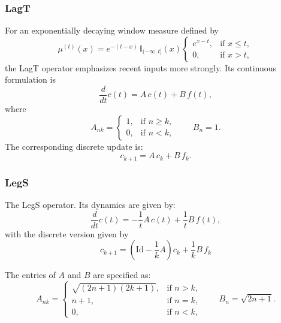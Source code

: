 \documentclass{article}
\theoremstyle{definition}
\begin{document}
\subsubsection{LagT}

For an exponentially decaying window measure defined by
\[
    \mu^{(t)}(x) = e^{-(t-x)} \, \mathbb{I}_{(-\infty, t]}(x)
    \begin{cases}
    e^{x-t}, & \text{if } x \le t, \\
    0, & \text{if } x > t,
    \end{cases}
\]
the LagT operator emphasizes recent inputs more strongly. Its continuous formulation is
\[
\frac{d}{dt} c(t) = A\, c(t) + B\, f(t),
\]
where
\[
A_{nk} =
\begin{cases}
1, & \text{if } n \ge k, \\
0, & \text{if } n < k,
\end{cases}
\qquad
B_n = 1.
\]
The corresponding discrete update is:
\[
c_{k+1} = A\, c_k + B\, f_k.
\]

\subsubsection{LegS}

The LegS operator. Its dynamics are given by:
\[
\frac{d}{dt} c(t) = -\frac{1}{t} A\, c(t) + \frac{1}{t} B\, f(t),
\]
with the discrete version given by
\[
    c_{k+1} = \left(\mathrm{Id} - \frac{1}{k} A\right) c_k + \frac{1}{k} B\, f_k
\]

The entries of \(A\) and \(B\) are specified as:
\[
A_{nk} =
\begin{cases}
\sqrt{(2n+1)(2k+1)}, & \text{if } n > k, \\
n+1, & \text{if } n = k, \\
0, & \text{if } n < k,
\end{cases}
\qquad
B_n = \sqrt{2n+1}.
\]
\end{document}
